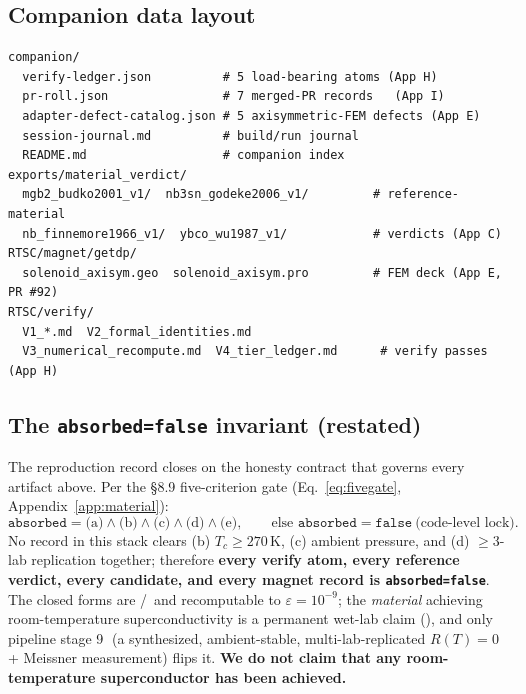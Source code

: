 \subsection{Companion data layout}
\label{app:repro-companion}

\begin{lstlisting}
companion/
  verify-ledger.json          # 5 load-bearing atoms (App H)
  pr-roll.json                # 7 merged-PR records   (App I)
  adapter-defect-catalog.json # 5 axisymmetric-FEM defects (App E)
  session-journal.md          # build/run journal
  README.md                   # companion index
exports/material_verdict/
  mgb2_budko2001_v1/  nb3sn_godeke2006_v1/         # reference-material
  nb_finnemore1966_v1/  ybco_wu1987_v1/            # verdicts (App C)
RTSC/magnet/getdp/
  solenoid_axisym.geo  solenoid_axisym.pro         # FEM deck (App E, PR #92)
RTSC/verify/
  V1_*.md  V2_formal_identities.md
  V3_numerical_recompute.md  V4_tier_ledger.md      # verify passes (App H)
\end{lstlisting}

\subsection{The \texttt{absorbed=false} invariant (restated)}
\label{app:repro-invariant}

The reproduction record closes on the honesty contract that governs every
artifact above. Per the \S8.9 five-criterion gate
(Eq.~\ref{eq:fivegate}, Appendix~\ref{app:material}):
\begin{equation}
\texttt{absorbed} = \text{(a)}\wedge\text{(b)}\wedge\text{(c)}\wedge
  \text{(d)}\wedge\text{(e)},
\qquad
\text{else } \texttt{absorbed}=\texttt{false}\ \text{(code-level lock)}.
\end{equation}
No record in this stack clears (b) $T_c\!\ge\!270$\,K, (c) ambient
pressure, and (d) $\ge\!3$-lab replication together; therefore
\textbf{every verify atom, every reference verdict, every candidate, and
every magnet record is \texttt{absorbed=false}}. The closed forms are
\tierBlue/\tierGreen\ and recomputable to $\varepsilon=10^{-9}$; the
\emph{material} achieving room-temperature superconductivity is a permanent
wet-lab claim (\tierOrange), and only pipeline stage
\textcircled{\scriptsize 9} (a synthesized, ambient-stable,
multi-lab-replicated $R(T)\!=\!0$ + Meissner measurement) flips it.
\textbf{We do not claim that any room-temperature superconductor has been
achieved.}
